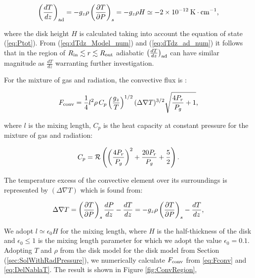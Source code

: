 \documentclass[12pt,english,preprint]{aastex}
\newcommand{\su}[2]{#1_{\rm #2}}
\newcommand{\Rout}{\su{R}{out}}
\newcommand{\Rin}{\su{R}{in}}
\begin{document}
\begin{equation}
\left(\frac{dT}{dz}\right)_{{\rm ad}}=
-g_{z}\rho\left(\frac{\partial T}{\partial P}\right)_{s}=-g_{z}\rho H
\simeq-2\times10^{-12}\:{\rm K}\cdot{\rm cm}^{-1}\mbox{\mbox{,}}\label{eq:dTdz_ad_num}
\end{equation}

\noindent where the disk height $H$ is calculated taking into account the equation
of state (\ref{eq:Ptot}). From
(\ref{eq:dTdz_Model_num}) and (\ref{eq:dTdz_ad_num}) it follows that
in the region of $\Rin\lesssim r\lesssim \Rout$ adiabatic
$\left(\frac{dT}{dz}\right)_{{\rm ad}}$ can have similar magnitude
as $\frac{dT}{dz}$ warranting further investigation. 

For the mixture of gas and radiation, the convective flux is \citep{KippenhahnWeigert94,BisnovatyiKogan2001book}:

\begin{equation}
F_{{\rm conv}}=\frac{1}{4}l^{2}\rho\,C_{p}\left(\frac{g_{z}}{T}\right)^{1/2}(\Delta\nabla T)^{3/2}\sqrt{\frac{4P_r}{P_{g}}+1}\mbox{,}\label{eq:Fconv}
\end{equation}

\noindent where $l$ is the mixing length, $C_{p}$ is the heat capacity at constant pressure for the mixture
of gas and radiation:

\begin{equation}
C_{p}={\cal R}\left(\left(\frac{4P_r}{P_{g}}\right)^{2}+\frac{20P_r}{P_{g}}+\frac{5}{2}\right)\mbox{.}\label{eq:Cp}
\end{equation}

\noindent The temperature excess of the convective element over its surroundings
is represented by $(\Delta\nabla T)$ which is found from:

\begin{equation}
\Delta\nabla T=\left(\frac{\partial T}{\partial P}\right)_{s}\frac{dP}{dz}-\frac{dT}{dz}=-g_{z}\rho\left(\frac{\partial T}{\partial P}\right)_{s}-\frac{dT}{dz}\mbox{,}\label{eq:DelNablaT}
\end{equation}

\noindent We adopt $l\simeq\epsilon_{0}H$ for the mixing length, where
$H$ is the half-thickness of the disk and $\epsilon_{0}\leq1$ is
the mixing length parameter for which we adopt the value $\epsilon_{0}=0.1$.
Adopting  $T$ and $\rho$ from the disk model for the disk model from Section (\ref{sec:SolWithRadPressure}), we numerically 
calculate $\su{F}{conv}$ from \eqref{eq:Fconv} and \eqref{eq:DelNablaT}.
The result is shown in 
Figure \ref{fig:ConvRegion},
\end{document}
